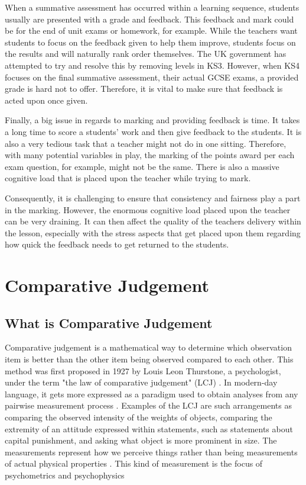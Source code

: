 		When a summative assessment has occurred within a learning sequence, students usually are presented with a grade and feedback. This feedback and mark could be for the end of unit exams or homework, for example. While the teachers want students to focus on the feedback given to help them improve, students focus on the results and will naturally rank order themselves. The UK government has attempted to try and resolve this by removing levels in KS3. However, when KS4 focuses on the final summative assessment, their actual GCSE exams, a provided grade is hard not to offer. Therefore, it is vital to make sure that feedback is acted upon once given.
		
		Finally, a big issue in regards to marking and providing feedback is time. It takes a long time to score a students' work and then give feedback to the students. It is also a very tedious task that a teacher might not do in one sitting. Therefore, with many potential variables in play, the marking of the points award per each exam question, for example, might not be the same. There is also a massive cognitive load that is placed upon the teacher while trying to mark.
		
		Consequently, it is challenging to ensure that consistency and fairness play a part in the marking. However, the enormous cognitive load placed upon the teacher can be very draining. It can then affect the quality of the teachers delivery within the lesson, especially with the stress aspects that get placed upon them regarding how quick the feedback needs to get returned to the students.
	
	\section{Comparative Judgement}
	
	
	\subsection{What is Comparative Judgement} 
		Comparative judgement is a mathematical way to determine which observation item is better than the other item being observed compared to each other. This method was first proposed in 1927 by Louis Leon Thurstone, a psychologist, under the term "the law of comparative judgement" (LCJ) \cite{thurstone1927psychophysical, thurstone1927law}. In modern-day language, it gets more expressed as a paradigm used to obtain analyses from any pairwise measurement process \cite{research_ed}. Examples of the LCJ are such arrangements as comparing the observed intensity of the weights of objects, comparing the extremity of an attitude expressed within statements, such as statements about capital punishment, and asking what object is more prominent in size.  The measurements represent how we perceive things rather than being measurements of actual physical properties \cite{arbuckle1973general}. This kind of measurement is the focus of psychometrics and psychophysics \cite{furr2021psychometrics, gescheider2013psychophysics}
		
